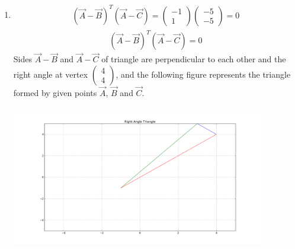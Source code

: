 \documentclass[journal,12pt,twocolumn]{IEEEtran}
\newcommand{\myvec}[1]{\ensuremath{\begin{pmatrix}#1\end{pmatrix}}}
\begin{document}
\begin{enumerate}
\item \begin{align}{(\vec{A}-\vec{B})}^T  (\vec{A}-\vec{C}) =  \myvec{ -1 \\ 1 }  \myvec{ -5 \\ -5 } = 0\end{align}
\begin {align}{(\vec{A}-\vec{B})}^T  (\vec{A}-\vec{C}) = 0  \end {align}
Sides $\vec{A}-\vec{B}$ and  $\vec{A}-\vec{C}$  of triangle are perpendicular to each other and the right angle at vertex \myvec{ 4 \\ 4 }, and the following figure represents the triangle formed by given points $\vec{A}$, $\vec{B}$ and $\vec{C}$.  
\includegraphics[width=11cm, height=7cm]{vihi}
\end{enumerate}
\end{document}
